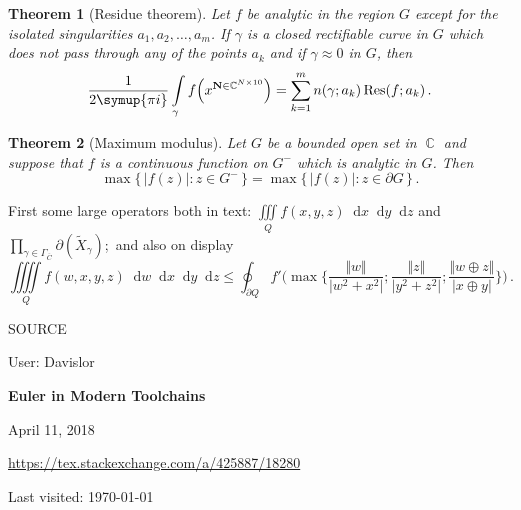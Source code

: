 \documentclass{article}
\DeclareMathOperator\Res{Res}
\newcommand*\diff{\mathop{}\!\mathup{d}}
\newtheorem{theorem}{Theorem}
\begin{document}
	
	\begin{theorem}[Residue theorem]
		Let $f$ be analytic in the region $G$ except for the isolated
		singularities $a_1,a_2,\dots,a_m$. If $\gamma$ is a closed
		rectifiable curve in $G$ which does not pass through any of the
		points $a_k$ and if $\gamma\approx 0$ in $G$, then
		\[
		\frac{1}{2\symup{\pi i}} \int\limits_\gamma f\Bigl(x^{\mathbf{N}\in\mathbb{C}^{N\times 10}}\Bigr)
		= \sum_{k=1}^m n(\gamma;a_k)\Res(f;a_k)\,.
		\]
	\end{theorem}
	
	\begin{theorem}[Maximum modulus]
		Let $G$ be a bounded open set in $\BbbC$ and suppose that $f$ is a
		continuous function on $G^-$ which is analytic in $G$. Then
		\[
		\max\{\, |f(z)|:z\in G^- \,\} = \max\{\, |f(z)|:z\in \partial G \,\}\,.
		\]
	\end{theorem}
	
	First some large operators both in text:
	$\iiint\limits_{Q}f(x,y,z) \diff x \diff y \diff z$
	and
	$\prod_{\gamma\in\Gamma_{\bar{C}}}\partial(\tilde{X}_\gamma)$;\
	and also on display
	\[
	\iiiint\limits_{Q}f(w,x,y,z) \diff w \diff x \diff y \diff z
	\leq
	\oint_{\partial Q} f'\Biggl(\max\Biggl\{
	\frac{\Vert w\Vert}{\vert w^2+x^2\vert};
	\frac{\Vert z\Vert}{\vert y^2+z^2\vert};
	\frac{\Vert w\oplus z\Vert}{\vert x\oplus y\vert}
	\Biggr\}\Biggr)\,.
	\]
	
	\vfill
	
	\noindent SOURCE

	 User: Davislor
	 
	 \textbf{Euler in Modern Toolchains}
	 
	 April 11, 2018
	 
\url{https://tex.stackexchange.com/a/425887/18280}

Last visited: \today
\end{document}
